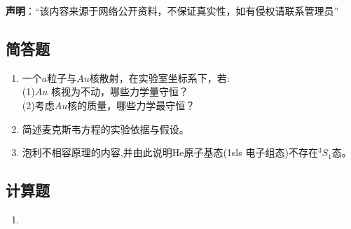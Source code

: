 
\textbf{声明}：“该内容来源于网络公开资料，不保证真实性，如有侵权请联系管理员”

\subsection{简答题}
\begin{enumerate}
\item 一个$a$粒子与$Au$核散射，在实验室坐标系下，若:\\
(1)$Au$ 核视为不动，哪些力学量守恒？\\
(2)考虑$Au$核的质量，哪些力学最守恒？
\item 简述麦克斯韦方程的实验依据与假设。
\item 泡利不相容原理的内容,并由此说明He原子基态(1sls 电子组态)不存在$^3S_1$态。
\end{enumerate}
\subsection{计算题}
\begin{enumerate}
\item 
\end{enumerate}